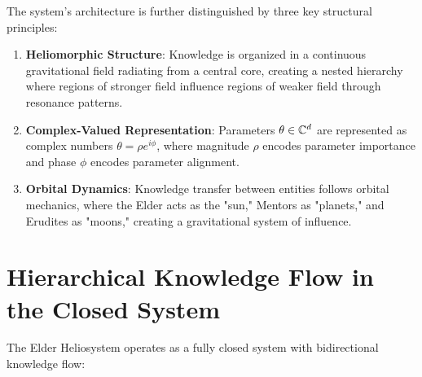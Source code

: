 The system's architecture is further distinguished by three key structural principles:

\begin{enumerate}
    \item \textbf{Heliomorphic Structure}: Knowledge is organized in a continuous gravitational field radiating from a central core, creating a nested hierarchy where regions of stronger field influence regions of weaker field through resonance patterns.
    
    \item \textbf{Complex-Valued Representation}: Parameters $\theta \in \mathbb{C}^{d}$ are represented as complex numbers $\theta = \rho e^{i\phi}$, where magnitude $\rho$ encodes parameter importance and phase $\phi$ encodes parameter alignment.
    
    \item \textbf{Orbital Dynamics}: Knowledge transfer between entities follows orbital mechanics, where the Elder acts as the "sun," Mentors as "planets," and Erudites as "moons," creating a gravitational system of influence.
\end{enumerate}

\section{Hierarchical Knowledge Flow in the Closed System}

The Elder Heliosystem operates as a fully closed system with bidirectional knowledge flow:


